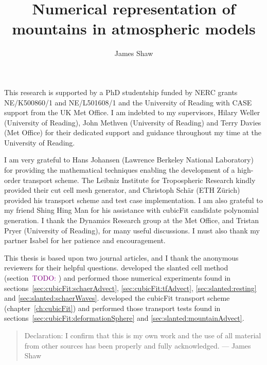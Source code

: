\documentclass[a4paper,oneside]{memoir}
\title{Numerical representation of mountains in atmospheric models}
\author{James Shaw}
\date{\TODO{date}}
\newcommand{\TODO}[1]{\textcolor{purple}{TODO: \emph{#1}}}
\newenvironment{acknowledgements}
{\renewcommand{\abstractname}{Acknowledgements}\abstract}
{\endabstract}
\begin{document}


\frontmatter
\nobibliography*

\thispagestyle{plain}
\null\vfil
\begin{acknowledgements}
This research is supported by a PhD studentship funded by NERC grants NE/K500860/1 and NE/L501608/1 and the University of Reading with CASE support from the UK Met Office.  I am indebted to my supervisors, Hilary Weller (University of Reading), John Methven (University of Reading) and Terry Davies (Met Office) for their dedicated support and guidance throughout my time at the University of Reading.

I am very grateful to Hans Johansen (Lawrence Berkeley National Laboratory) for providing the mathematical techniques enabling the development of a high-order transport scheme.  The Leibniz Institute for Tropospheric Research kindly provided their cut cell mesh generator, and Christoph Sch\"{a}r (ETH Z\"{u}rich) provided his transport scheme and test case implementation.
I am also grateful to my friend Shing Hing Man for his assistance with cubicFit candidate polynomial generation.  I thank the Dynamics Research group at the Met Office, and Tristan Pryer (University of Reading), for many useful discussions.
I must also thank my partner Isabel for her patience and encouragement.
	
This thesis is based upon two journal articles, and I thank the anonymous reviewers for their helpful questions. \citet{shaw-weller2016} developed the slanted cell method (section~\TODO{}) and performed those numerical experiments found in sections~\ref{sec:cubicFit:schaerAdvect}, \ref{sec:cubicFit:tfAdvect}, \ref{sec:slanted:resting} and \ref{sec:slanted:schaerWaves}.
\citet{shaw2017} developed the cubicFit transport scheme (chapter~\ref{ch:cubicFit}) and performed those transport tests found in sections~\ref{sec:cubicFit:deformationSphere} and \ref{sec:slanted:mountainAdvect}.

\vspace*{4em}


\end{acknowledgements}
\vfil
\begin{quote}{\small Declaration: I confirm that this is my own work and the use of all material from other sources has been properly and fully acknowledged. --- James Shaw}
\end{quote}

\cleardoublepage
\end{document}
